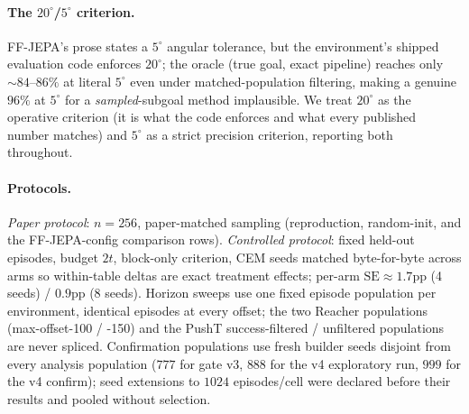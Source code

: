 \documentclass{article}
\newcommand{\degc}[1]{$#1^\circ$}
\begin{document}
\paragraph{The \degc{20}/\degc{5} criterion.} FF-JEPA's prose states a \degc{5} angular
tolerance, but the environment's shipped evaluation code enforces \degc{20}; the oracle
(true goal, exact pipeline) reaches only ${\sim}84$--$86\%$ at literal \degc{5} even
under matched-population filtering, making a genuine $96\%$ at \degc{5} for a
\emph{sampled}-subgoal method implausible. We treat \degc{20} as the operative
criterion (it is what the code enforces and what every published number matches) and
\degc{5} as a strict precision criterion, reporting both throughout.

\paragraph{Protocols.} \emph{Paper protocol}: $n{=}256$, paper-matched sampling
(reproduction, random-init, and the FF-JEPA-config comparison rows). \emph{Controlled
protocol}: fixed held-out episodes, budget $2t$, block-only criterion, CEM seeds
matched byte-for-byte across arms so within-table deltas are exact treatment effects;
per-arm $\mathrm{SE}\approx1.7$pp (4 seeds) / $0.9$pp (8 seeds). Horizon sweeps use one
fixed episode population per environment, identical episodes at every offset; the two
Reacher populations (max-offset-100 / -150) and the PushT success-filtered /
unfiltered populations are never spliced. Confirmation populations use fresh builder
seeds disjoint from every analysis population ($777$ for gate v3, $888$ for the v4
exploratory run, $999$ for the v4 confirm); seed extensions to $1024$
episodes/cell were declared before their results and pooled without selection.
\end{document}
